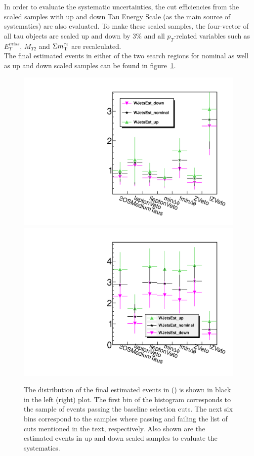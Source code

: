 In order to evaluate the systematic uncertainties, the cut efficiencies from the scaled samples with 
up and down Tau Energy Scale (as the main source of systematics) are also evaluated.
To make these scaled samples, the four-vector of all tau objects 
are scaled up and down by 3\% and all $p_T$-related variables such as $E_T^{miss}$, $M_{T2}$ and $\Sigma m_{\rm T}^{\tau_i}$ are recalculated.\\
The final estimated \wjets events in either of the two search regions for nominal as well as up and down scaled samples 
can be found in figure~\ref{fig:wjets_1}.  
\begin{figure}[!Hhtb]
\centering
\includegraphics[angle=0,scale=0.35]{TauTauFigs/WJets_bin1.pdf}
\includegraphics[angle=0,scale=0.35]{TauTauFigs/WJets_binII.pdf}\\
\caption{The distribution of the final estimated \wjets events in \binone (\bintwo) is shown in black in the left (right) plot. 
 The first bin of the histogram corresponds to the sample of events passing the baseline selection cuts. 
The next six bins correspond to the samples where passing and failing the 
list of cuts mentioned in the text, respectively. Also shown are the estimated \wjets events in up and down scaled samples to evaluate the systematics.}
\label{fig:wjets_1}
\end{figure}
